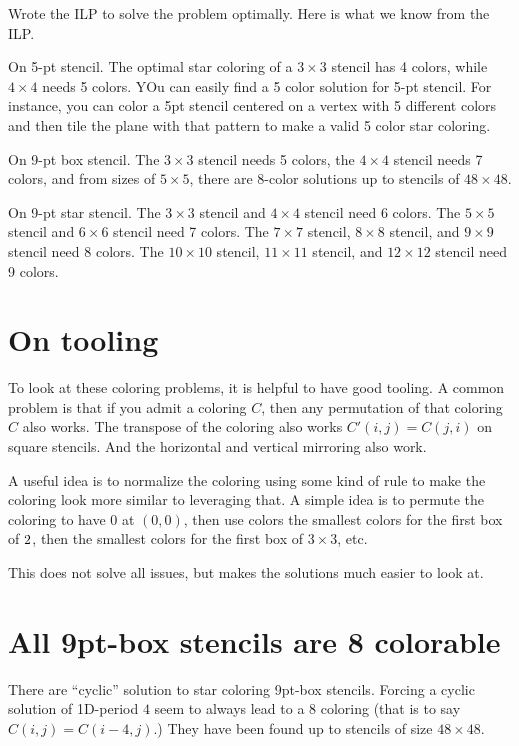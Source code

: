 \documentclass{article}
\begin{document}
Wrote the ILP to solve the problem optimally. Here is what we know
from the ILP.

On 5-pt stencil. The optimal star coloring of a $3 \times 3$ stencil
has 4 colors, while $4 \times 4$ needs 5 colors. YOu can easily find a
5 color solution for 5-pt stencil. For instance, you can color a 5pt stencil
centered on a vertex with 5 different colors and then tile the plane
with that pattern to make a valid 5 color star coloring.

On 9-pt box stencil. The $3 \times 3$ stencil needs 5 colors, the $4
\times 4$ stencil needs 7 colors, and from sizes of $5 \times 5$,
there are 8-color solutions up to stencils of $48 \times 48$.

On 9-pt star stencil. The $3 \times 3$ stencil and $4 \times 4$
stencil need 6 colors. The $5 \times 5$ stencil and $6 \times 6$
stencil need 7 colors. The $7 \times 7$ stencil, $8 \times 8$ stencil,
and $9 \times 9$ stencil need 8 colors. The $10 \times 10$ stencil, $11 \times 11$ stencil,
and $12 \times 12$ stencil need 9 colors.

\section{On tooling}

To look at these coloring problems, it is helpful to have good
tooling. A common problem is that if you admit a coloring $C$, then
any permutation of that coloring $C$ also works. The transpose of the
coloring also works $C'(i,j) = C(j,i)$ on square stencils. And the
horizontal and vertical mirroring also work.

A useful idea is to normalize the coloring using some kind of rule to
make the coloring look more similar to leveraging that. A simple idea
is to permute the coloring to have 0 at $(0,0)$, then use colors the
smallest colors for the first box of $2\time 2$, then the smallest
colors for the first box of $3 \times 3$, etc.

This does not solve all issues, but makes the solutions much easier to
look at.

\section{All 9pt-box stencils are 8 colorable}

There are ``cyclic'' solution to star coloring 9pt-box
stencils. Forcing a cyclic solution of 1D-period $4$ seem to always
lead to a 8 coloring (that is to say $C(i,j) = C(i-4,j)$.) They have
been found up to stencils of size $48 \times 48$.
\end{document}
